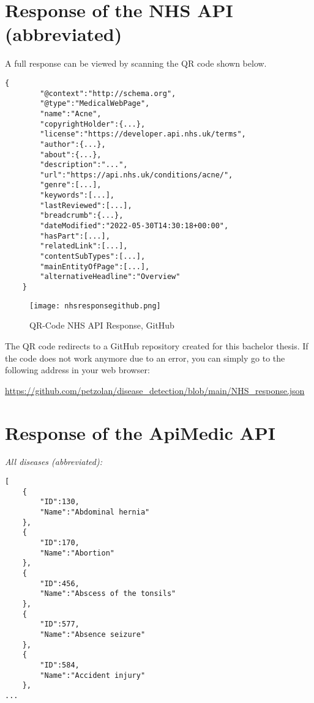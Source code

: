 \tocless\section{Response of the NHS API (abbreviated)}
A full response can be viewed by scanning the QR code shown below. 
\begin{lstlisting}[caption={Abbreviated Response of NHS API}]
	{
		"@context":"http://schema.org",
		"@type":"MedicalWebPage",
		"name":"Acne",
		"copyrightHolder":{...},
		"license":"https://developer.api.nhs.uk/terms",
		"author":{...},
		"about":{...},
		"description":"...",
		"url":"https://api.nhs.uk/conditions/acne/",
		"genre":[...],
		"keywords":[...],
		"lastReviewed":[...],
		"breadcrumb":{...},
		"dateModified":"2022-05-30T14:30:18+00:00",
		"hasPart":[...],
		"relatedLink":[...],
		"contentSubTypes":[...],
		"mainEntityOfPage":[...],
		"alternativeHeadline":"Overview"
	}
\end{lstlisting}
\begin{figure}[H]
	\centering
	\texttt{[image: nhsresponsegithub.png]}
	\caption{QR-Code NHS API Response, GitHub}
\end{figure}
The QR code redirects to a GitHub repository created for this bachelor thesis. If the code does not work anymore due to an error, you can simply go to the following address in your web browser:
\begin{center}
	\url{https://github.com/petzolan/disease_detection/blob/main/NHS_response.json}
\end{center}
\pagebreak
\tocless\section{Response of the ApiMedic API}
\textit{All diseases (abbreviated):} 

\begin{lstlisting}[basicstyle=\tiny, caption={Abbreviated Reponse of all Diseases ApiMedic API}]
[
	{
		"ID":130,
		"Name":"Abdominal hernia"
	},
	{
		"ID":170,
		"Name":"Abortion"
	},
	{
		"ID":456,
		"Name":"Abscess of the tonsils"
	},
	{
		"ID":577,
		"Name":"Absence seizure"
	},
	{
		"ID":584,
		"Name":"Accident injury"
	},
...
\end{lstlisting}


